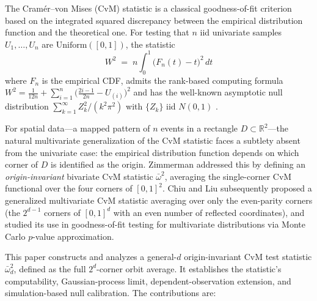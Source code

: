 \documentclass[pdflatex]{sn-jnl}
\theoremstyle{thmstyleone}
\theoremstyle{thmstyletwo}
\theoremstyle{thmstylethree}
\newcommand{\R}{\mathbb{R}}
\begin{document}
The Cram\'er--von Mises (CvM) statistic \cite{Cramer1928,vonMises1931,Smirnov1937} is a classical goodness-of-fit criterion based on the integrated squared discrepancy between the empirical distribution function and the theoretical one. For testing that $n$ iid univariate samples $U_1,\dots,U_n$ are $\mathrm{Uniform}([0,1])$, the statistic
\[
  W^2 \;=\; n\int_0^1 \bigl(F_n(t) - t\bigr)^2\,dt
\]
where $F_n$ is the empirical CDF, admits the rank-based computing formula $W^2 = \frac{1}{12n} + \sum_{i=1}^n\bigl(\frac{2i-1}{2n} - U_{(i)}\bigr)^2$ and has the well-known asymptotic null distribution $\sum_{k=1}^\infty Z_k^2/(k^2\pi^2)$ with $\{Z_k\}$ iid $N(0,1)$ \cite{AndersonDarling1952,DurbinKnott1972}.

For spatial data---a mapped pattern of $n$ events in a rectangle $D\subset\R^2$---the natural multivariate generalization of the CvM statistic faces a subtlety absent from the univariate case: the empirical distribution function depends on which corner of $D$ is identified as the origin. Zimmerman \cite{Zimmerman1993} addressed this by defining an \emph{origin-invariant} bivariate CvM statistic $\bar\omega^2$, averaging the single-corner CvM functional over the four corners of $[0,1]^2$. Chiu and Liu \cite{ChiuLiu2009} subsequently proposed a generalized multivariate CvM statistic averaging over only the even-parity corners (the $2^{d-1}$ corners of $[0,1]^d$ with an even number of reflected coordinates), and studied its use in goodness-of-fit testing for multivariate distributions via Monte Carlo $p$-value approximation.

This paper constructs and analyzes a general-$d$ origin-invariant CvM test statistic $\bar\omega^2_d$, defined as the full $2^d$-corner orbit average. It establishes the statistic's computability, Gaussian-process limit, dependent-observation extension, and simulation-based null calibration. The contributions are:
\end{document}
